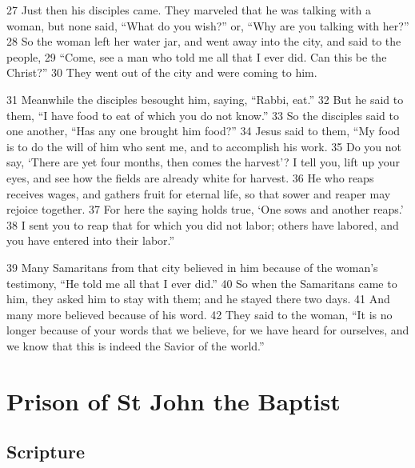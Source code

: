 \documentclass[letterpaper]{report}
\begin{document}
\begin{multicols}{2}
27 Just then his disciples came. They marveled that he was talking with a woman, but none said, “What do you wish?” or, “Why are you talking with her?” 28 So the woman left her water jar, and went away into the city, and said to the people, 29 “Come, see a man who told me all that I ever did. Can this be the Christ?” 30 They went out of the city and were coming to him.

31 Meanwhile the disciples besought him, saying, “Rabbi, eat.” 32 But he said to them, “I have food to eat of which you do not know.” 33 So the disciples said to one another, “Has any one brought him food?” 34 Jesus said to them, “My food is to do the will of him who sent me, and to accomplish his work. 35 Do you not say, ‘There are yet four months, then comes the harvest’? I tell you, lift up your eyes, and see how the fields are already white for harvest. 36 He who reaps receives wages, and gathers fruit for eternal life, so that sower and reaper may rejoice together. 37 For here the saying holds true, ‘One sows and another reaps.’ 38 I sent you to reap that for which you did not labor; others have labored, and you have entered into their labor.”

39 Many Samaritans from that city believed in him because of the woman’s testimony, “He told me all that I ever did.” 40 So when the Samaritans came to him, they asked him to stay with them; and he stayed there two days. 41 And many more believed because of his word. 42 They said to the woman, “It is no longer because of your words that we believe, for we have heard for ourselves, and we know that this is indeed the Savior of the world.”
\end{multicols}

\clearpage
\section{Prison of St John the Baptist}
\begin{multicols}{2}
	\mbox{}
\end{multicols}
\subsection{Scripture}
\end{document}
